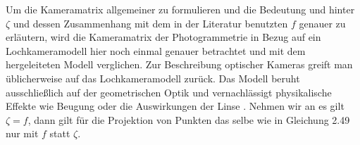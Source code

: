 		
		Um die Kameramatrix allgemeiner zu formulieren und die Bedeutung und hinter $\zeta$ und dessen Zusammenhang mit dem in der Literatur benutzten $f$ genauer zu erläutern, wird die Kameramatrix der Photogrammetrie in Bezug auf ein Lochkameramodell hier noch einmal genauer betrachtet und mit dem hergeleiteten Modell verglichen\cite{HZ,Heipke}. Zur Beschreibung optischer Kameras greift man üblicherweise auf das Lochkameramodell zurück. Das Modell beruht ausschließlich auf der geometrischen Optik und vernachlässigt physikalische Effekte wie Beugung oder die Auswirkungen der Linse \cite{Heipke}.  Nehmen wir an es gilt $\zeta = f$, dann gilt für die Projektion von Punkten das selbe wie in Gleichung 2.49 nur mit $f$ statt $\zeta$. 
		
